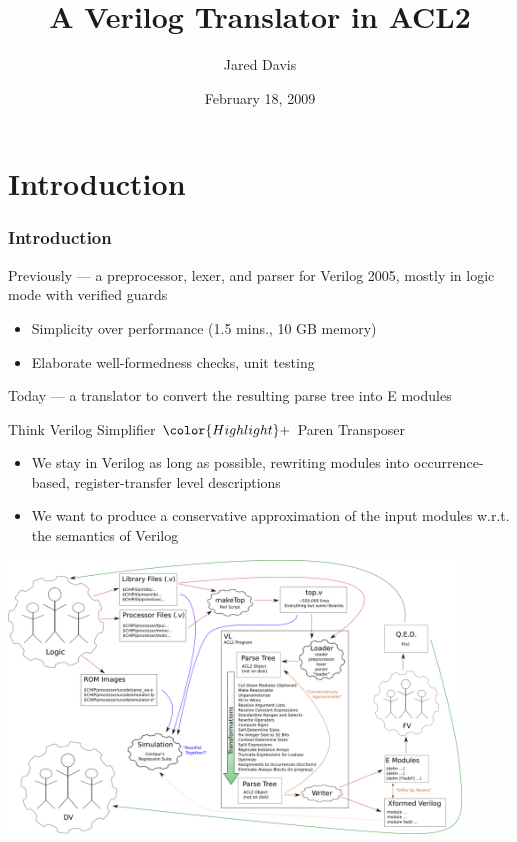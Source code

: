 \documentclass[mathserif]{beamer}
\title{A Verilog Translator in ACL2}
\author[Page \thepage]{Jared Davis}
\institute{Centaur Technology}
\date{February 18, 2009}
\newcommand{\Highlight}[1]{{\color{Highlight}#1}}
\begin{document}
\maketitle
\logo{}



\section[Introduction]{Introduction}
\begin{frame}
\frametitle{Introduction}

Previously --- a preprocessor, lexer, and parser for Verilog 2005, mostly in
logic mode with verified guards
\begin{itemize}
\item Simplicity over performance (1.5 mins., 10 GB memory)
\item Elaborate well-formedness checks, unit testing
\end{itemize}

\bigskip

Today --- a translator to convert the resulting parse tree into E modules

\bigskip

Think \Highlight{Verilog Simplifier} $\Highlight{+}$ \Highlight{Paren Transposer}
\begin{itemize}
\item We stay in Verilog as long as possible, rewriting modules into
 occurrence-based, register-transfer level descriptions
\item We want to produce a \Highlight{conservative approximation} of the input 
 modules w.r.t. the semantics of Verilog
\end{itemize}

\end{frame}


\begin{frame}
\begin{center}
\includegraphics[width=12cm]{vl}
\end{center}
\end{frame}
\end{document}
